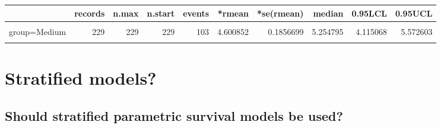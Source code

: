 \documentclass[
]{article}
\begin{document}
\begin{table}[H]
\centering
\begin{tabular}{lrrrrrrrrr}
\toprule
  & records & n.max & n.start & events & *rmean & *se(rmean) & median & 0.95LCL & 0.95UCL\\
\midrule
\cellcolor{gray!6}{group=Good} & \cellcolor{gray!6}{229} & \cellcolor{gray!6}{229} & \cellcolor{gray!6}{229} & \cellcolor{gray!6}{51} & \cellcolor{gray!6}{5.934330} & \cellcolor{gray!6}{0.1616003} & \cellcolor{gray!6}{NA} & \cellcolor{gray!6}{NA} & \cellcolor{gray!6}{NA}\\
group=Medium & 229 & 229 & 229 & 103 & 4.600852 & 0.1856699 & 5.254795 & 4.115068 & 5.572603\\
\cellcolor{gray!6}{group=Poor} & \cellcolor{gray!6}{228} & \cellcolor{gray!6}{228} & \cellcolor{gray!6}{228} & \cellcolor{gray!6}{145} & \cellcolor{gray!6}{3.101736} & \cellcolor{gray!6}{0.1772520} & \cellcolor{gray!6}{2.183562} & \cellcolor{gray!6}{1.978082} & \cellcolor{gray!6}{2.619178}\\
\bottomrule
\end{tabular}
\end{table}

\newpage

\hypertarget{stratified-models}{%
\section{Stratified models?}\label{stratified-models}}

\hypertarget{should-stratified-parametric-survival-models-be-used}{%
\subsection{Should stratified parametric survival models be
used?}\label{should-stratified-parametric-survival-models-be-used}}
\end{document}
